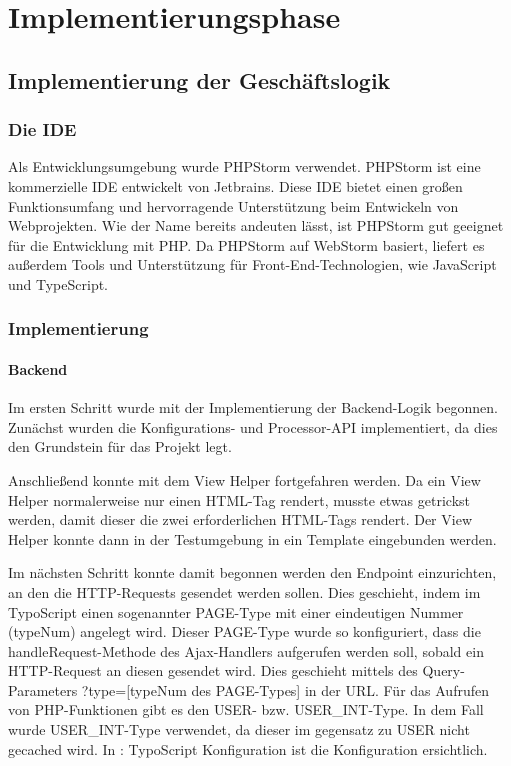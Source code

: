\section{Implementierungsphase} 
\label{sec:Implementierungsphase}

\subsection{Implementierung der Geschäftslogik}
\label{sec:ImplementierungGeschaeftslogik}

\subsubsection{Die IDE}
Als Entwicklungsumgebung wurde PHPStorm verwendet. PHPStorm ist eine kommerzielle IDE entwickelt von Jetbrains. Diese IDE bietet einen großen Funktionsumfang und hervorragende Unterstützung beim Entwickeln von Webprojekten. Wie der Name bereits andeuten lässt, ist PHPStorm gut geeignet für die Entwicklung mit PHP. Da PHPStorm auf WebStorm basiert, liefert es außerdem Tools und Unterstützung für Front-End-Technologien, wie JavaScript und TypeScript.

\subsubsection{Implementierung}

\paragraph{Backend} Im ersten Schritt wurde mit der Implementierung der Backend-Logik begonnen. Zunächst wurden die Konfigurations- und Processor-API implementiert, da dies den Grundstein für das Projekt legt. 

Anschließend konnte mit dem View Helper fortgefahren werden. Da ein View Helper normalerweise nur einen HTML-Tag rendert, musste etwas getrickst werden, damit dieser die zwei erforderlichen HTML-Tags rendert. Der View Helper konnte dann in der Testumgebung in ein Template eingebunden werden. 

Im nächsten Schritt konnte damit begonnen werden den Endpoint einzurichten, an den die HTTP-Requests gesendet werden sollen. Dies geschieht, indem im TypoScript einen sogenannter PAGE-Type mit einer eindeutigen Nummer (typeNum) angelegt wird. Dieser PAGE-Type wurde so konfiguriert, dass die handleRequest-Methode des Ajax-Handlers aufgerufen werden soll, sobald ein HTTP-Request an diesen gesendet wird. Dies geschieht mittels des Query-Parameters ?type=[typeNum des PAGE-Types] in der URL. Für das Aufrufen von PHP-Funktionen gibt es den USER- bzw. USER\_INT-Type. In dem Fall wurde USER\_INT-Type verwendet, da dieser im gegensatz zu USER nicht gecached wird. In : TypoScript Konfiguration ist die Konfiguration ersichtlich. 

